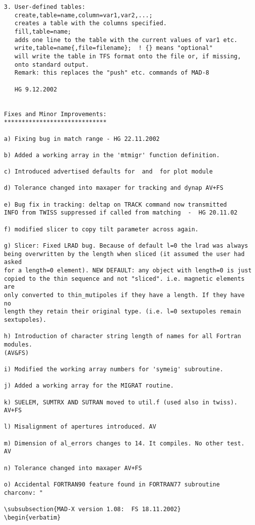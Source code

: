 \begin{verbatim}
3. User-defined tables:
   create,table=name,column=var1,var2,...;
   creates a table with the columns specified.
   fill,table=name;
   adds one line to the table with the current values of var1 etc.
   write,table=name{,file=filename};  ! {} means "optional"
   will write the table in TFS format onto the file or, if missing,
   onto standard output.
   Remark: this replaces the "push" etc. commands of MAD-8

   HG 9.12.2002


Fixes and Minor Improvements:
*****************************

a) Fixing bug in match range - HG 22.11.2002

b) Added a working array in the 'mtmigr' function definition.

c) Introduced advertised defaults for  and  for plot module

d) Tolerance changed into maxaper for tracking and dynap AV+FS

e) Bug fix in tracking: deltap on TRACK command now transmitted
INFO from TWISS suppressed if called from matching  -  HG 20.11.02

f) modified slicer to copy tilt parameter across again.

g) Slicer: Fixed LRAD bug. Because of default l=0 the lrad was always 
being overwritten by the length when sliced (it assumed the user had asked 
for a length=0 element). NEW DEFAULT: any object with length=0 is just 
copied to the thin sequence and not "sliced". i.e. magnetic elements are 
only converted to thin_mutipoles if they have a length. If they have no 
length they retain their original type. (i.e. l=0 sextupoles remain 
sextupoles).

h) Introduction of character string length of names for all Fortran modules. 
(AV&FS)

i) Modified the working array numbers for 'symeig' subroutine.

j) Added a working array for the MIGRAT routine.

k) SUELEM, SUMTRX AND SUTRAN moved to util.f (used also in twiss). AV+FS

l) Misalignment of apertures introduced. AV

m) Dimension of al_errors changes to 14. It compiles. No other test. AV

n) Tolerance changed into maxaper AV+FS

o) Accidental FORTRAN90 feature found in FORTRAN77 subroutine charconv: "

\subsubsection{MAD-X version 1.08:  FS 18.11.2002}
\begin{verbatim}


\end{verbatim}
